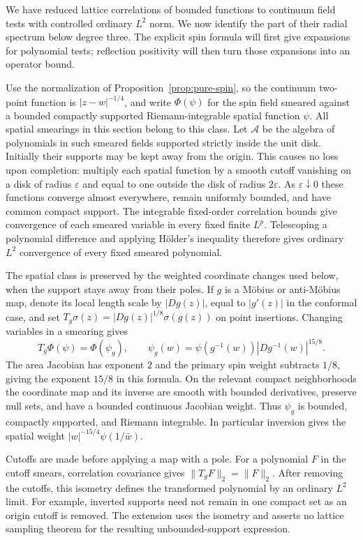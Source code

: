 We have reduced lattice correlations of bounded functions to continuum
field tests with controlled ordinary $L^2$ norm.  We now identify the
part of their radial spectrum below degree three.  The explicit spin
formula will first give expansions for polynomial tests; reflection
positivity will then turn those expansions into an operator bound.

Use the normalization of Proposition~\ref{prop:pure-spin}, so the
continuum two-point function is $|z-w|^{-1/4}$, and write $\Phi(\psi)$
for the spin field smeared against a bounded compactly supported
Riemann-integrable spatial function $\psi$.  All spatial smearings in
this section belong to this class.  Let $\mathcal A$ be the algebra of
polynomials in such smeared fields supported strictly inside the unit
disk.  Initially their supports may be kept away from the origin.
This causes no loss upon completion: multiply each spatial function by
a smooth cutoff vanishing on a disk of radius $\varepsilon$ and equal to one
outside the disk of radius $2\varepsilon$.  As $\varepsilon\downarrow0$
these functions converge almost everywhere, remain uniformly bounded,
and have common compact support.  The integrable fixed-order correlation
bounds give convergence of each smeared variable in every fixed finite
$L^p$.  Telescoping a polynomial difference and applying H\"older's
inequality therefore gives ordinary $L^2$ convergence of every fixed
smeared polynomial.

The spatial class is preserved by the weighted coordinate changes used
below, when the support stays away from their poles.  If $g$ is a
M\"obius or anti-M\"obius map, denote its local length scale by
$|Dg(z)|$, equal to $|g'(z)|$ in the conformal case, and set
$T_g\sigma(z)=|Dg(z)|^{1/8}\sigma(g(z))$ on point insertions.
Changing variables in a smearing gives
\begin{equation}
 T_g\Phi(\psi)=\Phi(\psi_g),\qquad
 \psi_g(w)=\psi(g^{-1}(w))|Dg^{-1}(w)|^{15/8}.
 \label{eq:transfer-spatial-transform}
\end{equation}
The area Jacobian has exponent $2$ and the primary spin weight subtracts
$1/8$, giving the exponent $15/8$ in this formula.  On the relevant
compact neighborhoods the coordinate map and its inverse are smooth
with bounded derivatives, preserve null sets, and have a bounded
continuous Jacobian weight.  Thus $\psi_g$ is bounded, compactly
supported, and Riemann integrable.  In particular inversion gives the
spatial weight $|w|^{-15/4}\psi(1/\bar w)$.

Cutoffs are made before applying a map with a pole.  For a polynomial
$F$ in the cutoff smears, correlation covariance gives
$\|T_gF\|_2=\|F\|_2$.  After removing the cutoffs, this isometry
defines the transformed polynomial by an ordinary $L^2$ limit.  For
example, inverted supports need not remain in one compact set as an
origin cutoff is removed.  The extension uses the isometry and asserts
no lattice sampling theorem for the resulting unbounded-support
expression.

